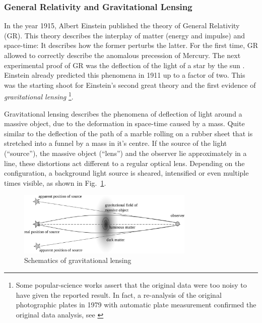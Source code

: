 \documentclass[11pt]{article}
\begin{document}
\subsubsection{General Relativity and Gravitational Lensing}

In the year 1915, Albert Einstein published the theory of General Relativity (GR).
This theory describes the interplay of matter (energy and impulse) and space-time: It describes how the former perturbs the latter.
For the first time, GR allowed to correctly describe the anomalous precession of Mercury.
The next experimental proof of GR was the deflection of the light of a star by the sun \cite{1920RSPTA.220..291D}.
Einstein already predicted this phenomena in 1911 up to a factor of two.
This was the starting shoot for Einstein’s second great theory and the first evidence of \emph{gravitational lensing}
\footnote{Some popular-science works assert that the original data were
        too noisy to have given the reported result.  In fact, a
        re-analysis of the original photographic plates in 1979 with
        automatic plate measurement confirmed the original data
        analysis, see \cite{kennefick2009testing}}.

Gravitational lensing describes the phenomena of deflection of light around a massive object, due to the deformation in space-time caused by a mass.
Quite similar to the deflection of the path of a marble rolling on a rubber sheet that is stretched into a funnel by a mass in it's centre.
If the source of the light (``source''), the massive object (``lens'') and the observer lie approximately in a line, these distortions act different to a regular optical lens.
Depending on the configuration, a background light source is sheared, intensified or even multiple times visible, as shown in Fig.~\ref{fig:grav_lens}.

\begin{figure}[ht]
	\centering
		\includegraphics[width=0.75\textwidth]{img/grav_lens}
	\caption{Schematics of gravitational lensing}
	\label{fig:grav_lens}
\end{figure}
\end{document}
